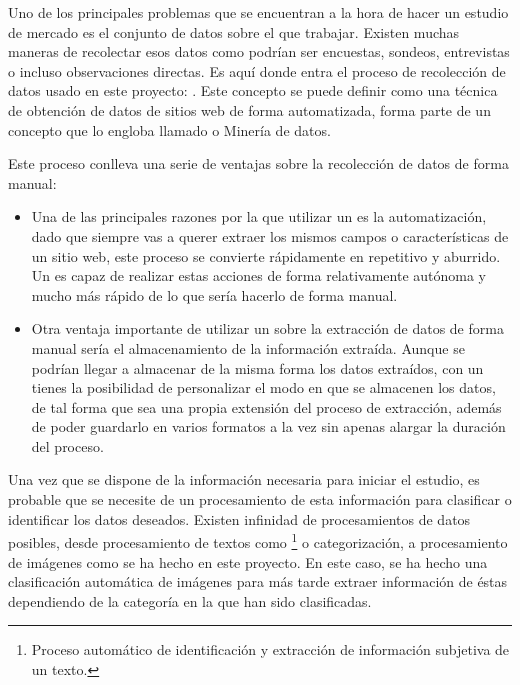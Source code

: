 
Uno de los principales problemas que se encuentran a la hora de hacer un estudio de mercado es el conjunto de datos sobre el que trabajar. Existen muchas maneras de recolectar esos datos como podrían ser encuestas, sondeos, entrevistas o incluso observaciones directas. Es aquí donde entra el proceso de recolección de datos usado en este proyecto: . Este concepto se puede definir como una técnica de obtención de datos de sitios web de forma automatizada, forma parte de un concepto que lo engloba llamado  o Minería de datos.

Este proceso conlleva una serie de ventajas sobre la recolección de datos de forma manual:

\begin{itemize}
	\item Una de las principales razones por la que utilizar un  es la automatización, dado que siempre vas a querer extraer los mismos campos o características de un sitio web, este proceso se convierte rápidamente en repetitivo y aburrido. Un  es capaz de realizar estas acciones de forma relativamente autónoma y mucho más rápido de lo que sería hacerlo de forma manual.
	\item Otra ventaja importante de utilizar un  sobre la extracción de datos de forma manual sería el almacenamiento de la información extraída. Aunque se podrían llegar a almacenar de la misma forma los datos extraídos, con un  tienes la posibilidad de personalizar el modo en que se almacenen los datos, de tal forma que sea una propia extensión del proceso de extracción, además de poder guardarlo en varios formatos a la vez sin apenas alargar la duración del proceso.
\end{itemize}

Una vez que se dispone de la información necesaria para iniciar el estudio, es probable que se necesite de un procesamiento de esta información para clasificar o identificar los datos deseados. Existen infinidad de procesamientos de datos posibles, desde procesamiento de textos como \footnote{Proceso automático de identificación y extracción de información subjetiva de un texto.} o categorización, a procesamiento de imágenes como se ha hecho en este proyecto. En este caso, se ha hecho una clasificación automática de imágenes para más tarde extraer información de éstas dependiendo de la categoría en la que han sido clasificadas.